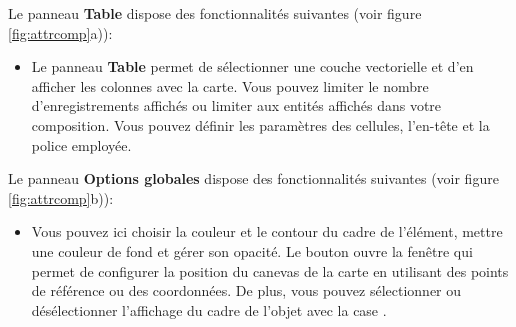 
Le panneau \textbf{Table} dispose des fonctionnalités suivantes (voir figure  \ref{fig:attrcomp}a)):

\begin{itemize}[label=--]
\item Le panneau \textbf{Table} permet de sélectionner une couche vectorielle et d'en afficher les colonnes avec la carte. Vous pouvez limiter le nombre d'enregistrements affichés ou limiter aux entités affichés dans votre composition. Vous pouvez définir les paramètres des cellules, l'en-tête et la police employée.
\end{itemize}


Le panneau \textbf{Options globales} dispose des fonctionnalités suivantes (voir figure  \ref{fig:attrcomp}b)):

\begin{itemize}[label=--]
\item Vous pouvez ici choisir la couleur et le contour du cadre de l'élément, mettre une couleur de fond et gérer son opacité. Le bouton  ouvre la fenêtre  qui permet de configurer la position du canevas de la carte en utilisant des points de référence ou des coordonnées. De plus, vous pouvez sélectionner ou désélectionner l'affichage du cadre de l'objet avec la case .
\end{itemize}

